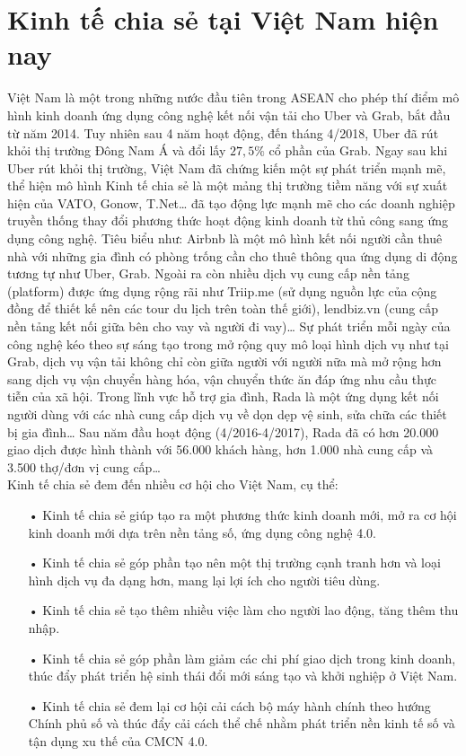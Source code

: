 \documentclass[12pt,a4paper]{report}
\begin{document}
\section{Kinh tế chia sẻ tại Việt Nam hiện nay}
Việt Nam là một trong những nước đầu tiên trong ASEAN cho phép thí điểm mô hình kinh doanh ứng dụng  công nghệ kết nối vận tải cho Uber và Grab, bắt đầu từ năm 2014. Tuy nhiên sau 4 năm hoạt động, đến tháng 4/2018, Uber đã rút khỏi thị trường Đông Nam Á và đổi lấy $27,5\%$ cổ phần của Grab. Ngay sau khi Uber rút khỏi thị trường, Việt Nam đã chứng kiến một sự phát triển mạnh mẽ, thể hiện mô hình Kinh tế chia sẻ là một mảng thị trường tiềm năng với sự xuất hiện của VATO, Gonow, T.Net… đã tạo động lực mạnh mẽ cho các doanh nghiệp truyền thống thay đổi phương thức hoạt động kinh doanh từ thủ công sang ứng dụng công nghệ. Tiêu biểu như: Airbnb là một mô hình kết nối người cần thuê nhà với những gia đình có phòng trống cần cho thuê thông qua ứng dụng di động tương tự như Uber, Grab. Ngoài ra còn nhiều dịch vụ cung cấp nền tảng (platform) được ứng dụng rộng rãi như Triip.me (sử dụng nguồn lực của cộng đồng để thiết kế nên các tour du lịch trên toàn thế giới), lendbiz.vn (cung cấp nền tảng kết nối giữa bên cho vay và người đi vay)… Sự phát triển mỗi ngày của công nghệ kéo theo sự sáng tạo trong mở rộng quy mô loại hình dịch vụ như tại Grab, dịch vụ vận tải không chỉ còn giữa người với người nữa mà mở rộng hơn sang dịch vụ vận chuyển hàng hóa, vận chuyển thức ăn đáp ứng nhu cầu thực tiễn của xã hội. Trong lĩnh vực hỗ trợ gia đình, Rada là một ứng dụng kết nối người dùng với các nhà cung cấp dịch vụ về dọn dẹp vệ sinh, sửa chữa các thiết bị gia đình… Sau năm đầu hoạt động (4/2016-4/2017), Rada đã có hơn 20.000 giao dịch được hình thành với 56.000 khách hàng, hơn 1.000 nhà cung cấp và 3.500 thợ/đơn vị cung cấp…\\

Kinh tế chia sẻ đem đến nhiều cơ hội cho Việt Nam, cụ thể:
\begin{itemize}
\item[•]Kinh tế chia sẻ giúp tạo ra một phương thức kinh doanh mới, mở ra cơ hội kinh doanh mới dựa trên nền tảng số, ứng dụng công nghệ 4.0.
\item[•]Kinh tế chia sẻ góp phần tạo nên một thị trường cạnh tranh hơn và loại hình dịch vụ đa dạng hơn, mang lại lợi ích cho người tiêu dùng.
\item[•] Kinh tế chia sẻ tạo thêm nhiều việc làm cho người lao động, tăng thêm thu nhập.
\item[•] Kinh tế chia sẻ góp phần làm giảm các chi phí giao dịch trong kinh doanh, thúc đẩy phát triển hệ sinh thái đổi mới sáng tạo và khởi nghiệp ở Việt Nam.
\item[•] Kinh tế chia sẻ đem lại cơ hội cải cách bộ máy hành chính theo hướng Chính phủ số và
thúc đẩy cải cách thể chế nhằm phát triển nền kinh tế số và tận dụng xu thế của CMCN 4.0.
\end{itemize}
\end{document}
